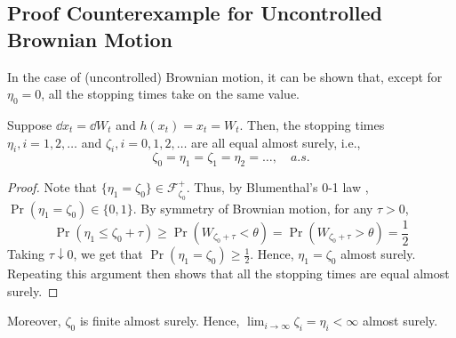 \documentclass[twocolumn,amsthm]{autart}
\begin{document}
\subsection{Proof Counterexample for Uncontrolled Brownian Motion}
In the case of (uncontrolled) Brownian motion, it can be shown that, except for $\eta_0 = 0$, all the stopping times take on the same value.
\begin{lem}[]
    Suppose $\dd{x_t} = \dd{W}_t$ and $h(x_t) = x_t = W_t$. Then, the stopping times $\eta_i, i = 1, 2, \dots$ and $\zeta_i, i = 0, 1, 2, \dots$ are all equal almost surely, i.e.,
    \begin{equation}
        \zeta_0 = \eta_1 = \zeta_1 = \eta_2 = \dots,\quad a.s.
    \end{equation}
\end{lem}
\begin{proof}

    Note that $\{ \eta_1 = \zeta_0 \} \in \mathcal{F}_{\zeta_0}^+$. Thus, by Blumenthal's 0-1 law \cite{le2016brownian}, $\Pr(\eta_1 = \zeta_0) \in \{0, 1\}$. By symmetry of Brownian motion, for any $\tau > 0$,
    \begin{equation}
        \Pr( \eta_1 \leq \zeta_0 + \tau) \geq \Pr(W_{\zeta_0 + \tau} < \theta ) = \Pr(W_{\zeta_0 + \tau} > \theta) = \frac{1}{2}
    \end{equation}
    Taking $\tau \downarrow 0$, we get that $\Pr(\eta_1 = \zeta_0) \geq \frac{1}{2}$. Hence, $\eta_1 = \zeta_0$ almost surely. Repeating this argument then shows that all the stopping times are equal almost surely.
\end{proof}
Moreover, $\zeta_0$ is finite almost surely. Hence, $\lim_{i \to \infty} \zeta_i = \eta_i < \infty$ almost surely.
\end{document}

